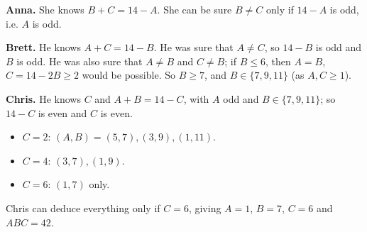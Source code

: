 \textbf{Anna.} She knows $B+C=14-A$. She can be sure $B\ne C$ only if $14-A$ is odd, i.e. $A$ is odd.

\textbf{Brett.} He knows $A+C=14-B$. He was sure that $A\ne C$, so $14-B$ is odd and $B$ is odd. He was also sure that $A\ne B$ and $C\ne B$; if $B\le6$, then $A=B$, $C=14-2B\ge2$ would be possible. So $B\ge7$, and $B\in\{7,9,11\}$ (as $A,C\ge1$).

\textbf{Chris.} He knows $C$ and $A+B=14-C$, with $A$ odd and $B\in\{7,9,11\}$; so $14-C$ is even and $C$ is even.
\begin{itemize}
\item $C=2$: $(A,B)=(5,7),(3,9),(1,11)$.
\item $C=4$: $(3,7),(1,9)$.
\item $C=6$: $(1,7)$ only.
\end{itemize}
Chris can deduce everything only if $C=6$, giving $A=1$, $B=7$, $C=6$ and $ABC=\boxed{42}$.
